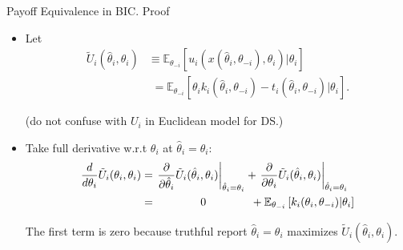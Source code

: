 \documentclass[english,10pt
,aspectratio=169
]{beamer}
\begin{document}
\begin{frame}{Payoff Equivalence in BIC. Proof}
	\begin{itemize}
		\item Let 
		\vspace{-0.5em}\begin{align*}
		\tilde{U}_i (\hat{\theta}_i,\theta_i) &\equiv \mathbb{E}_{\theta_{-i}} \left[ u_i \left( x(\hat{\theta}_i, \theta_{-i}), \theta_i \right) | \theta_i \right]
		\\
		&\,\,= \mathbb{E}_{\theta_{-i}} \left[ \theta_i k_i(\hat{\theta}_i, \theta_{-i}) - t_i \left( \hat{\theta}_i, \theta_{-i} \right) | \theta_i \right].
		\end{align*}\vspace{-1em}
		
		(do not confuse with $U_i$ in Euclidean model for DS.)
		\pause
		\item Take full derivative w.r.t $\theta_i$ at $\hat{\theta}_i=\theta_i$:
		\vspace{-0.5em}\begin{align*}
		\frac{d}{d \theta_i} \tilde{U}_i (\theta_i,\theta_i) &= \left. \frac{\partial}{\partial \hat{\theta}_i} \tilde{U}_i (\hat{\theta}_i,\theta_i) \right|_{\hat{\theta}_i=\theta_i} + \left. \frac{\partial}{\partial \theta_i} \tilde{U}_i (\hat{\theta}_i,\theta_i) \right|_{\hat{\theta}_i=\theta_i}
		\\ &= \hspace{1.4cm} 0 \hspace{1.4cm} + \mathbb{E}_{\theta_{-i}} \left[k_i (\theta_i, \theta_{-i}) | \theta_i \right]
		\end{align*}\vspace{-1em}
		
		The first term is zero because truthful report $\hat{\theta}_i = \theta_i$ maximizes $\tilde{U}_i (\hat{\theta}_i,\theta_i)$.
	\end{itemize}
\end{frame}
\end{document}
